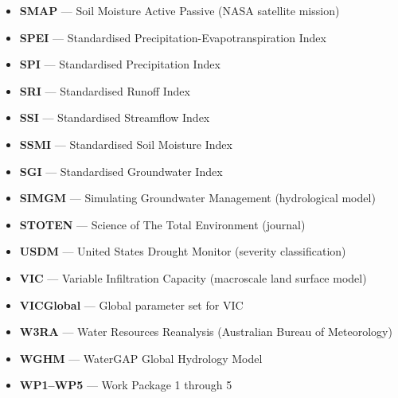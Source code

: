 \begin{itemize}
    \item \textbf{SMAP} --- Soil Moisture Active Passive (NASA satellite mission)
    \item \textbf{SPEI} --- Standardised Precipitation-Evapotranspiration Index
    \item \textbf{SPI} --- Standardised Precipitation Index
    \item \textbf{SRI} --- Standardised Runoff Index
    \item \textbf{SSI} --- Standardised Streamflow Index
    \item \textbf{SSMI} --- Standardised Soil Moisture Index
    \item \textbf{SGI} --- Standardised Groundwater Index
    \item \textbf{SIMGM} --- Simulating Groundwater Management (hydrological model)
    \item \textbf{STOTEN} --- Science of The Total Environment (journal)
    \item \textbf{USDM} --- United States Drought Monitor (severity classification)
    \item \textbf{VIC} --- Variable Infiltration Capacity (macroscale land surface model)
    \item \textbf{VICGlobal} --- Global parameter set for VIC
    \item \textbf{W3RA} --- Water Resources Reanalysis (Australian Bureau of Meteorology)
    \item \textbf{WGHM} --- WaterGAP Global Hydrology Model
    \item \textbf{WP1--WP5} --- Work Package 1 through 5
\end{itemize}
